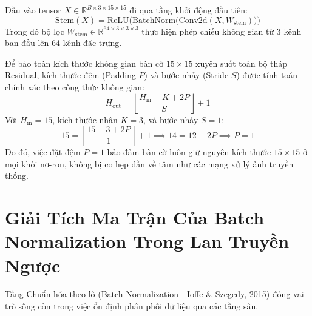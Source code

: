 \documentclass[11pt,a4paper]{report}
\begin{document}
Đầu vào tensor $X \in \mathbb{R}^{B \times 3 \times 15 \times 15}$ đi qua tầng khởi động đầu tiên:
\begin{equation}
    \text{Stem}(X) = \text{ReLU}\Big(\text{BatchNorm}\big(\text{Conv2d}(X, W_{\text{stem}})\big)\Big)
\end{equation}
Trong đó bộ lọc $W_{\text{stem}} \in \mathbb{R}^{64 \times 3 \times 3 \times 3}$ thực hiện phép chiếu không gian từ 3 kênh ban đầu lên 64 kênh đặc trưng.

Để bảo toàn kích thước không gian bàn cờ $15 \times 15$ xuyên suốt toàn bộ tháp Residual, kích thước đệm (Padding $P$) và bước nhảy (Stride $S$) được tính toán chính xác theo công thức không gian:
\begin{equation}
    H_{\text{out}} = \left\lfloor \frac{H_{\text{in}} - K + 2P}{S} \right\rfloor + 1
\end{equation}
Với $H_{\text{in}} = 15$, kích thước nhân $K = 3$, và bước nhảy $S = 1$:
\begin{equation}
    15 = \left\lfloor \frac{15 - 3 + 2P}{1} \right\rfloor + 1 \implies 14 = 12 + 2P \implies P = 1
\end{equation}
Do đó, việc đặt đệm $P = 1$ bảo đảm bàn cờ luôn giữ nguyên kích thước $15 \times 15$ ở mọi khối nơ-ron, không bị co hẹp dần về tâm như các mạng xử lý ảnh truyền thống.

\section{Giải Tích Ma Trận Của Batch Normalization Trong Lan Truyền Ngược}

Tầng Chuẩn hóa theo lô (Batch Normalization - Ioffe \& Szegedy, 2015) đóng vai trò sống còn trong việc ổn định phân phối dữ liệu qua các tầng sâu.
\end{document}
